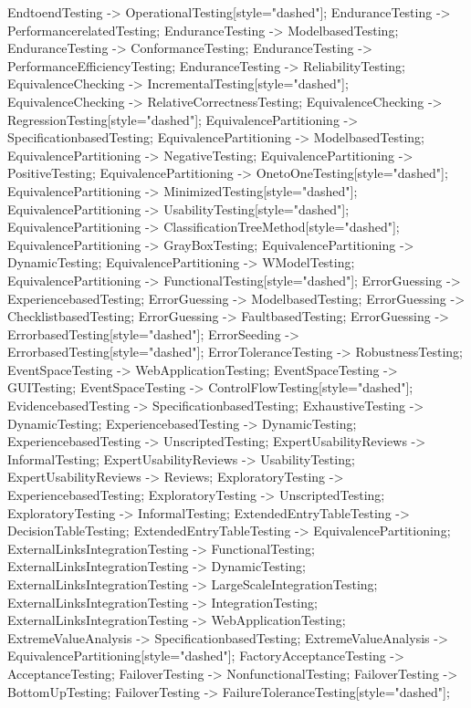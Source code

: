 \documentclass{article}
\begin{document}
{EndtoendTesting -> OperationalTesting[style="dashed"];
EnduranceTesting -> PerformancerelatedTesting;
EnduranceTesting -> ModelbasedTesting;
EnduranceTesting -> ConformanceTesting;
EnduranceTesting -> PerformanceEfficiencyTesting;
EnduranceTesting -> ReliabilityTesting;
EquivalenceChecking -> IncrementalTesting[style="dashed"];
EquivalenceChecking -> RelativeCorrectnessTesting;
EquivalenceChecking -> RegressionTesting[style="dashed"];
EquivalencePartitioning -> SpecificationbasedTesting;
EquivalencePartitioning -> ModelbasedTesting;
EquivalencePartitioning -> NegativeTesting;
EquivalencePartitioning -> PositiveTesting;
EquivalencePartitioning -> OnetoOneTesting[style="dashed"];
EquivalencePartitioning -> MinimizedTesting[style="dashed"];
EquivalencePartitioning -> UsabilityTesting[style="dashed"];
EquivalencePartitioning -> ClassificationTreeMethod[style="dashed"];
EquivalencePartitioning -> GrayBoxTesting;
EquivalencePartitioning -> DynamicTesting;
EquivalencePartitioning -> WModelTesting;
EquivalencePartitioning -> FunctionalTesting[style="dashed"];
ErrorGuessing -> ExperiencebasedTesting;
ErrorGuessing -> ModelbasedTesting;
ErrorGuessing -> ChecklistbasedTesting;
ErrorGuessing -> FaultbasedTesting;
ErrorGuessing -> ErrorbasedTesting[style="dashed"];
ErrorSeeding -> ErrorbasedTesting[style="dashed"];
ErrorToleranceTesting -> RobustnessTesting;
EventSpaceTesting -> WebApplicationTesting;
EventSpaceTesting -> GUITesting;
EventSpaceTesting -> ControlFlowTesting[style="dashed"];
EvidencebasedTesting -> SpecificationbasedTesting;
ExhaustiveTesting -> DynamicTesting;
ExperiencebasedTesting -> DynamicTesting;
ExperiencebasedTesting -> UnscriptedTesting;
ExpertUsabilityReviews -> InformalTesting;
ExpertUsabilityReviews -> UsabilityTesting;
ExpertUsabilityReviews -> Reviews;
ExploratoryTesting -> ExperiencebasedTesting;
ExploratoryTesting -> UnscriptedTesting;
ExploratoryTesting -> InformalTesting;
ExtendedEntryTableTesting -> DecisionTableTesting;
ExtendedEntryTableTesting -> EquivalencePartitioning;
ExternalLinksIntegrationTesting -> FunctionalTesting;
ExternalLinksIntegrationTesting -> DynamicTesting;
ExternalLinksIntegrationTesting -> LargeScaleIntegrationTesting;
ExternalLinksIntegrationTesting -> IntegrationTesting;
ExternalLinksIntegrationTesting -> WebApplicationTesting;
ExtremeValueAnalysis -> SpecificationbasedTesting;
ExtremeValueAnalysis -> EquivalencePartitioning[style="dashed"];
FactoryAcceptanceTesting -> AcceptanceTesting;
FailoverTesting -> NonfunctionalTesting;
FailoverTesting -> BottomUpTesting;
FailoverTesting -> FailureToleranceTesting[style="dashed"];
}
\end{document}
